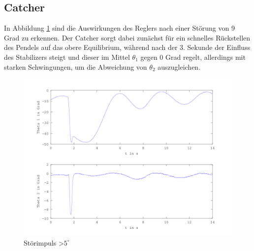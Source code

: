 \subsection{Catcher}
In Abbildung \ref{fig.Catcher-Plot} sind die Auswirkungen des Reglers nach einer Störung von 9 Grad zu erkennen. Der Catcher sorgt dabei zunächst für ein schnelles Rückstellen des Pendels auf das obere Equilibrium, während nach der 3. Sekunde der Einfluss des Stabilizers steigt und dieser im Mittel $\theta_1$ gegen 0 Grad regelt, allerdings mit starken Schwingungen, um die Abweichung von $\theta_2$ auszugleichen. 
\begin{figure}[htbp]
	\centering
	\includegraphics[width=1.\textwidth]{Grafiken/Catch_kurz.png}
%
	\caption{Störimpuls \textgreater $5^{\circ}$}
	\label{fig.Catcher-Plot}
\end{figure}

